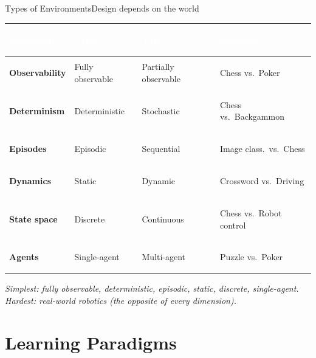 \documentclass[aspectratio=169,11pt]{beamer}
\begin{document}
\begin{frame}{Types of Environments}{Design depends on the world}
  \small
  \renewcommand{\arraystretch}{1.25}
  \begin{center}
  \begin{tabularx}{\textwidth}{@{}>{\bfseries}l >{\raggedright\arraybackslash}X >{\raggedright\arraybackslash}X >{\itshape\raggedright\arraybackslash}X@{}}
    \toprule
    \rowcolor{PrimaryDark}
    \textcolor{white}{Dimension} & \textcolor{white}{Type 1} &
    \textcolor{white}{Type 2} & \textcolor{white}{Example} \\
    \midrule
    Observability & Fully observable & Partially observable & Chess vs.\ Poker \\
    \rowcolor{PrimaryLight!25}
    Determinism & Deterministic & Stochastic & Chess vs.\ Backgammon \\
    Episodes & Episodic & Sequential & Image class.\ vs.\ Chess \\
    \rowcolor{PrimaryLight!25}
    Dynamics & Static & Dynamic & Crossword vs.\ Driving \\
    State space & Discrete & Continuous & Chess vs.\ Robot control \\
    \rowcolor{PrimaryLight!25}
    Agents & Single-agent & Multi-agent & Puzzle vs.\ Poker \\
    \bottomrule
  \end{tabularx}
  \end{center}
  \begin{center}\scriptsize\itshape
    Simplest: fully observable, deterministic, episodic, static, discrete, single-agent.
    Hardest: real-world robotics (the opposite of every dimension).
  \end{center}
\end{frame}

\section{Learning Paradigms}
\end{document}
